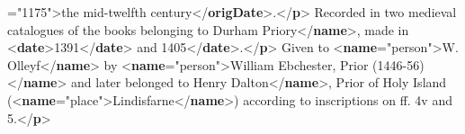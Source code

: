 \begin{shaded}
{\hspace*{1em}\hspace*{1em}\hspace*{1em}\hspace*{1em}{notAfter}="{1175}">}the mid-twelfth\mbox{}\newline 
\hspace*{1em}\hspace*{1em}\hspace*{1em}\hspace*{1em}\hspace*{1em}\hspace*{1em} century{</\textbf{origDate}>}.{</\textbf{p}>}\mbox{}\newline 
{}\mbox{}\newline 
{}\mbox{}\newline 
\hspace*{1em}Recorded in two medieval catalogues of the books belonging to\mbox{}\newline 
\hspace*{1em}Durham Priory{</\textbf{name}>}, made in {<\textbf{date}>}1391{</\textbf{date}>} and\mbox{}\newline 
\hspace*{1em}1405{</\textbf{date}>}.{</\textbf{p}>}\mbox{}\newline 
{}\mbox{}\newline 
{}\mbox{}\newline 
\hspace*{1em}Given to {<\textbf{name}\hspace*{1em}{type}="{person}">}W. Olleyf{</\textbf{name}>} by {<\textbf{name}\hspace*{1em}{type}="{person}">}William Ebchester, Prior (1446-56){</\textbf{name}>} and later belonged to\mbox{}\newline 
\hspace*{1em}Henry Dalton{</\textbf{name}>}, Prior of Holy Island ({<\textbf{name}\hspace*{1em}{type}="{place}">}Lindisfarne{</\textbf{name}>}) according to inscriptions on ff. 4v and 5.{</\textbf{p}>}\mbox{}\newline 

\end{shaded}
